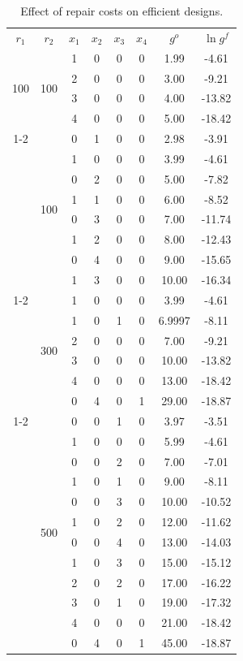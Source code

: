 \documentclass[11pt,authoryear,a4paper]{article}
\theoremstyle{definition}
\begin{document}
\begin{table}[tbp]
{\begin{tabular}{cccccccc}
    \hline
    $r_1$ & $r_2$ & $x_1$ & $x_2$ & $x_3$ & $x_4$ & $g^o$ & $\ln g^f$\\ 
         \multirow{4}{*}{100} & \multirow{4}{*}{100} %
         & 1 & 0 & 0 & 0 & 1.99 & -4.61\\
         && 2 & 0 & 0 & 0 & 3.00 & -9.21\\
         && 3 & 0 & 0 & 0 & 4.00 & -13.82\\
         && 4 & 0 & 0 & 0 & 5.00 & -18.42\\
         \cmidrule{1-2}
        \multirow{8}{*}{300} & \multirow{8}{*}{100} %
         &  0 & 1 & 0 & 0 & 2.98 & -3.91\\
         && 1 & 0 & 0 & 0 & 3.99 & -4.61\\
         && 0 & 2 & 0 & 0 & 5.00 & -7.82\\
         && 1 & 1 & 0 & 0 & 6.00 & -8.52\\
         && 0 & 3 & 0 & 0 & 7.00 & -11.74\\
         && 1 & 2 & 0 & 0 & 8.00 & -12.43\\
         && 0 & 4 & 0 & 0 & 9.00 & -15.65\\
         && 1 & 3 & 0 & 0 & 10.00 & -16.34\\
         \cmidrule{1-2}
        \multirow{6}{*}{300} & \multirow{6}{*}{300}%
        &  1 & 0 & 0 & 0 & 3.99   & -4.61\\
        && 1 & 0 & 1 & 0 & 6.9997 & -8.11\\
        && 2 & 0 & 0 & 0 & 7.00   & -9.21\\
        && 3 & 0 & 0 & 0 & 10.00  & -13.82\\
        && 4 & 0 & 0 & 0 & 13.00  & -18.42\\
        && 0 & 4 & 0 & 1 & 29.00  & -18.87\\
        \cmidrule{1-2}
        \multirow{12}{*}{500} & \multirow{12}{*}{500}%
         & 0 & 0 & 1 & 0 & 3.97  & -3.51\\
        && 1 & 0 & 0 & 0 & 5.99  & -4.61\\
        && 0 & 0 & 2 & 0 & 7.00  & -7.01\\
        && 1 & 0 & 1 & 0 & 9.00  & -8.11\\
        && 0 & 0 & 3 & 0 & 10.00 & -10.52\\
        && 1 & 0 & 2 & 0 & 12.00 & -11.62\\
        && 0 & 0 & 4 & 0 & 13.00 & -14.03\\
        && 1 & 0 & 3 & 0 & 15.00 & -15.12\\
        && 2 & 0 & 2 & 0 & 17.00 & -16.22\\
        && 3 & 0 & 1 & 0 & 19.00 & -17.32\\
        && 4 & 0 & 0 & 0 & 21.00 & -18.42\\
        && 0 & 4 & 0 & 1 & 45.00 & -18.87\\
        \hline
    \end{tabular}
    \caption{Effect of repair costs on efficient designs.}
    \label{tab:repCosts}
    }
\end{table}
\end{document}
